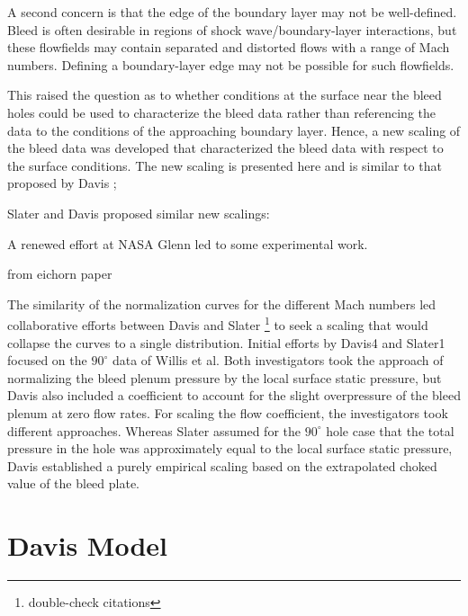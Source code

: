 A second concern is that the edge of the boundary layer may not be well-defined. Bleed is often desirable in regions of shock wave/boundary-layer interactions, but these flowfields may contain separated and distorted flows with a range of Mach numbers. Defining a boundary-layer edge may not be possible for such flowfields.



This raised the question as to whether conditions at the surface near the bleed holes could be used to characterize the bleed data rather than referencing the data  to the conditions of the approaching boundary layer. Hence, a new scaling of the bleed data was developed that characterized the bleed data with respect to the surface conditions. The new scaling is presented here and is similar to that proposed by Davis \cite{Davis2012}; 

Slater and Davis proposed similar new scalings:


A renewed effort at NASA Glenn led to some experimental work. 

from eichorn paper

The similarity of the normalization curves for the different Mach numbers led collaborative efforts between Davis \cite{Davis2012} and Slater \cite{Slater2012}\footnote{double-check citations} to seek a scaling that would collapse the curves to a single distribution. Initial efforts by Davis4 and Slater1 focused on the $90^\circ$ data of Willis et al. Both investigators took the approach of normalizing the bleed plenum pressure by the local surface static pressure, but Davis also included a coefficient to account for the slight overpressure of the bleed plenum at zero flow rates. For scaling the flow coefficient, the investigators took different approaches. Whereas Slater assumed for the $90^\circ$ hole case that the total pressure in the hole was approximately equal to the local surface static pressure, Davis established a purely empirical scaling based on the extrapolated choked value of the bleed plate.

\section{Davis Model}

